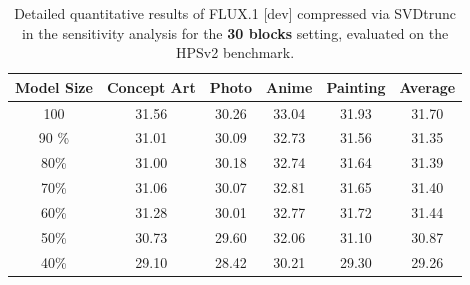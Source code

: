 \begin{table}[H]
	\centering
	{%
		
		\begin{tabular}{cccccc}
			
			\toprule
			\multicolumn{1}{c}{\textbf{Model Size}} &
			\multicolumn{1}{c}{Concept Art} &
			\multicolumn{1}{c}{Photo} &
			\multicolumn{1}{c}{Anime} &
			\multicolumn{1}{c}{Painting} &
			\multicolumn{1}{c}{Average}\\
			\midrule
			
			\color{gray} 100  %
			& \color{gray} 31.56  %
			& \color{gray} 30.26  %
			& \color{gray} 33.04  %
			& \color{gray} 31.93  %
			& \color{gray} 31.70  %
			\\
			\midrule
			
		
			
						90 \% &    %
						31.01 &    %
						30.09 &    %
						32.73 &    %
						31.56 &    %
						31.35  %
						\\
			
			80\% &    %
			31.00 &    %
			30.18 &    %
			32.74 &    %
			31.64 &    %
			31.39    %
			\\
			
			70\% &    %
			31.06 &    %
			30.07 &    %
			32.81 &    %
			31.65 &    %
			31.40     %
			\\
			
			60\% &    %
			31.28 &    %
			30.01 &    %
			32.77 &    %
		31.72&    %
			31.44     %
			\\
			
			50\% &    %
			30.73 &    %
			29.60 &    %
			32.06 &    %
			31.10 &    %
			30.87     %
			\\
			40\% &    %
			29.10 &    %
			28.42 &    %
			30.21 &    %
		29.30 &    %
			29.26    %
			\\
		
			\bottomrule
		\end{tabular}
	}
	\smallskip
	\caption[SVDtrunc Sensitivity Analysis 30 Blocks: Detailed HPSv2 Results]{Detailed quantitative results of FLUX.1 {[dev]} compressed via \gls{SVD}trunc in the sensitivity analysis for the \textbf{30 blocks} setting, evaluated on the HPSv2 benchmark.}
	\label{tab:hpsv_30blocks}
\end{table}

